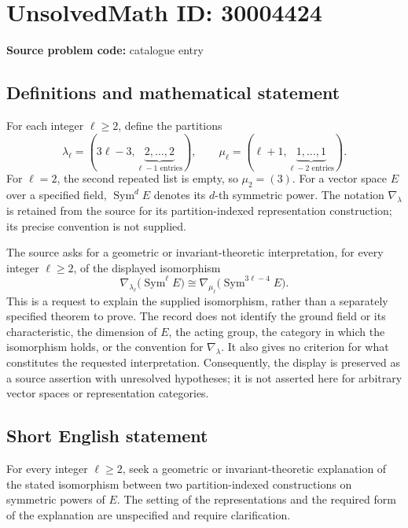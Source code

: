 \documentclass[11pt]{article}
\begin{document}
\section*{UnsolvedMath ID: 30004424}
\textbf{Source problem code:} catalogue entry
\subsection{Definitions and mathematical statement}
For each integer \(\ell\ge 2\), define the partitions
\[
\lambda_\ell=(3\ell-3,\underbrace{2,\ldots,2}_{\ell-1\text{ entries}}),\qquad
\mu_\ell=(\ell+1,\underbrace{1,\ldots,1}_{\ell-2\text{ entries}}).
\]
For \(\ell=2\), the second repeated list is empty, so \(\mu_2=(3)\). For a vector space \(E\) over a specified field, \(\operatorname{Sym}^{d}E\) denotes its \(d\)-th symmetric power. The notation \(\nabla_\lambda\) is retained from the source for its partition-indexed representation construction; its precise convention is not supplied.

The source asks for a geometric or invariant-theoretic interpretation, for every integer \(\ell\ge2\), of the displayed isomorphism
\[
\nabla_{\lambda_\ell}\bigl(\operatorname{Sym}^{\ell}E\bigr)
\cong
\nabla_{\mu_\ell}\bigl(\operatorname{Sym}^{3\ell-4}E\bigr).
\]
This is a request to explain the supplied isomorphism, rather than a separately specified theorem to prove. The record does not identify the ground field or its characteristic, the dimension of \(E\), the acting group, the category in which the isomorphism holds, or the convention for \(\nabla_\lambda\). It also gives no criterion for what constitutes the requested interpretation. Consequently, the display is preserved as a source assertion with unresolved hypotheses; it is not asserted here for arbitrary vector spaces or representation categories.
\subsection{Short English statement}
For every integer \(\ell\ge2\), seek a geometric or invariant-theoretic explanation of the stated isomorphism between two partition-indexed constructions on symmetric powers of \(E\). The setting of the representations and the required form of the explanation are unspecified and require clarification.
\end{document}
